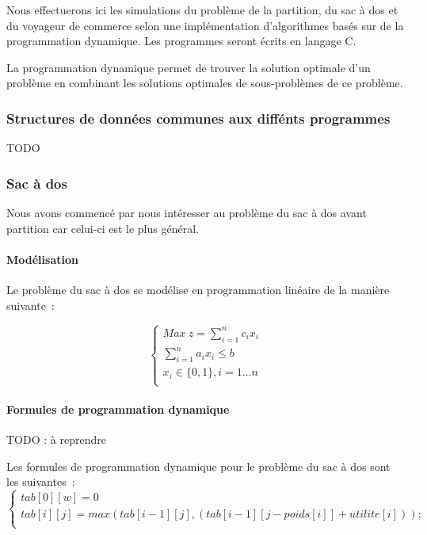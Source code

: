 \documentclass[a4paper, 12pt]{article}
\begin{document}
Nous effectuerons ici les simulations du problème de la partition, du sac
à dos et du voyageur de commerce selon une implémentation
d'algorithmes basés sur de la programmation dynamique. Les programmes
seront écrits en langage C.

La programmation dynamique permet de trouver la solution optimale d'un
problème en combinant les solutions optimales de sous-problèmes de ce
problème.

\subsubsection{Structures de données communes aux diffénts programmes}

TODO

\subsubsection{Sac à dos}

Nous avons commencé par nous intéresser au problème du sac à dos avant
partition car celui-ci est le plus général.

\paragraph{Modélisation}

Le problème du sac à dos se modélise en programmation linéaire de la
manière suivante~:

\begin{equation}
\begin{cases}
Max~z=\sum_{i=1}^nc_ix_i \\
\sum_{i=1}^na_ix_i \leq b \\
x_i \in\{0, 1\}, i=1\dots n\\
\end{cases}
\end{equation}

\paragraph{Formules de programmation dynamique}

TODO : à reprendre

Les formules de programmation dynamique pour le problème du sac à dos
sont les suivantes~:
\begin{equation}
\begin{cases}
tab[0][w] = 0 \\
tab[i][j] = max(tab[i-1] [j], (tab[i-1] [j-poids[i]] + utilite[i])); \\
\end{cases}
\end{equation}
\end{document}
